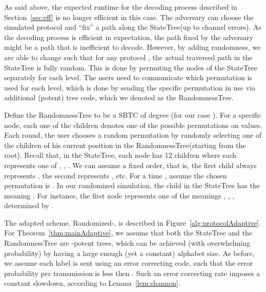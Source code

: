 \documentclass[ letterpaper, 11pt]{article}
\newcommand{\statetree}{{\textsf{StateTree}}\xspace}
\newcommand{\randomtree}{{\textsf{RandomnessTree}}\xspace}
\newcommand{\potent}{potent\xspace}
\newcommand{\KTC}{\textsf{SBTC}\xspace}
\begin{document}
As said above,
the expected runtime for the decoding process described in Section~\ref{sec:eff}
is no longer efficient in this case. The adversary can choose
the simulated protocol  and  ``fix'' a path along the
\statetree (up to channel errors). As the decoding process is efficient in expectation,
the path fixed by the adversary might be a path that is inefficient to decode.
However, by adding randomness, we are able to change  such that
for any protocol , the actual traversed path in the \statetree is fully random.
This is done by permuting the nodes of the \statetree
separately for each level. The users need to communicate which permutation
is used for each level, which is done by sending the specific permutation in use via
additional (\potent) tree code, which we denoted as the \randomtree.


Define the \randomtree to be a \KTC of degree  (for our case ).
For a specific node, each one of  the  children
denotes one of the possible permutations on  values.
Each round, the user chooses a random permutation by randomly selecting
one of the children of his current position in the \randomtree (starting from the root).
Recall that, in the \statetree, each node has 12 children where each represents one of
, , . We can assume a fixed order, that is, the first child always
represents , the second represents , etc.
For a time , assume the chosen permutation is .
In our randomized simulation, the  child in the
\statetree has the meaning  . For instance, the first node represents
one of the meanings , , , determined by .

The adapted scheme, Randomized-, is described in Figure~\ref{alg:protocolAdaptive}.
For Theorem~\ref{thm:mainAdaptive}, we assume that
both the \statetree and the \randomtree are -\potent trees,
which can be achieved (with overwhelming probability)
by having a large enough (yet a constant) alphabet size.
As before, we assume each label is sent using an error correcting code, such that
the error probability per transmission is less then .
Such an error correcting rate imposes
a constant slowdown, according to Lemma~\ref{lem:shannon}.
\end{document}
